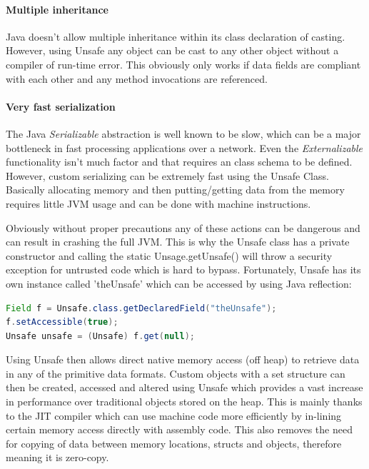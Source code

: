 \documentclass[final_report.tex]{subfiles}
\begin{document}
\paragraph*{Multiple inheritance}
Java doesn't allow multiple inheritance within its class declaration of casting. However, using Unsafe any object can be cast to any other object without a compiler of run-time error. This obviously only works if data fields are compliant with each other and any method invocations are referenced. 

\paragraph*{Very fast serialization}
The Java \textit{Serializable} abstraction is well known to be slow, which can be a major bottleneck in fast processing applications over a network. Even the \textit{Externalizable} functionality isn't much factor and that requires an class schema to be defined. However, custom serializing can be extremely fast using the Unsafe Class. Basically allocating memory and then putting/getting data from the memory requires little JVM usage and can be done with machine instructions.

Obviously without proper precautions any of these actions can be dangerous and can result in crashing the full JVM. This is why the Unsafe class has a private constructor and calling the static Unsage.getUnsafe() will throw a security exception for untrusted code which is hard to bypass. Fortunately, Unsafe has its own instance called 'theUnsafe' which can be accessed by using Java reflection:

\begin{lstlisting}[language=Java, caption={Accessing Java Unsafe}, label=lst:java_unsafe]
Field f = Unsafe.class.getDeclaredField("theUnsafe");
f.setAccessible(true);
Unsafe unsafe = (Unsafe) f.get(null);
\end{lstlisting}

Using Unsafe then allows direct native memory access (off heap) to retrieve data in any of the primitive data formats. Custom objects with a set structure can then be created, accessed and altered using Unsafe which provides a vast increase in performance over traditional objects stored on the heap. This is mainly thanks to the JIT compiler which can use machine code more efficiently by in-lining certain memory access directly with assembly code. This also removes the need for copying of data between memory locations, structs and objects, therefore meaning it is zero-copy.
\end{document}
